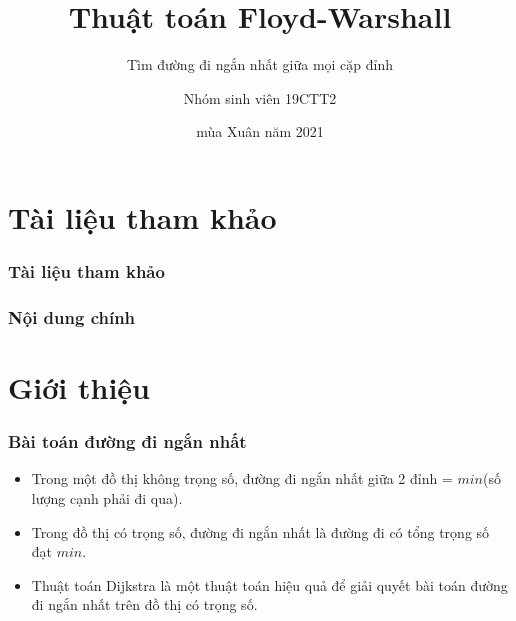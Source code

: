 \documentclass[12pt]{beamer}
\begin{document}
    \author{Nhóm sinh viên 19CTT2}
    \title{Thuật toán Floyd-Warshall}
    \subtitle{Tìm đường đi ngắn nhất giữa mọi cặp đỉnh}
    \date{mùa Xuân năm 2021}
    \begin{frame}[plain]
        \maketitle
    \end{frame}

    \section{Tài liệu tham khảo}
    \begin{frame}[allowframebreaks]
        \frametitle{Tài liệu tham khảo}
        
        
    \end{frame}

    \begin{frame}
    \frametitle{Nội dung chính}
    \tableofcontents
    \end{frame}

    \section{Giới thiệu}
    \begin{frame}
        \frametitle{Bài toán đường đi ngắn nhất}
        \begin{itemize}
            \item Trong một đồ thị không trọng số, đường đi ngắn nhất giữa 2 đỉnh = $min$(số lượng cạnh phải đi qua).\pause
            \item Trong đồ thị có trọng số, đường đi ngắn nhất là đường đi có tổng trọng số đạt $ min $.\pause
            \item Thuật toán Dijkstra là một thuật toán hiệu quả để giải quyết bài toán đường đi ngắn nhất trên đồ thị có trọng số.\cite{dijkstra1959note}
        \end{itemize}
    \end{frame}
\end{document}
